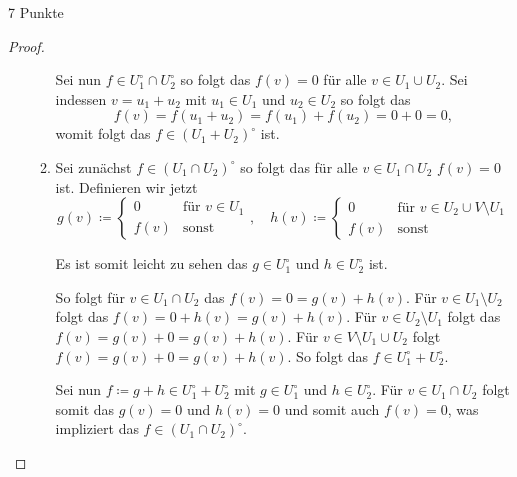 \documentclass{problemset}
\begin{document}
\begin{problem}{7 Punkte}
\begin{proof}
\begin{enumerate}
\begin{enumerate}
                        Sei nun \(f \in U_1^\circ \cap U_2^\circ\) so folgt das \(f(v) = 0\) für alle
                        \(v \in U_1 \cup U_2\). Sei indessen \(v = u_1 + u_2\) mit \(u_1 \in U_1\) und
                        \(u_2 \in U_2\) so folgt das
                        \begin{equation}
                            f(v) = f(u_1 + u_2) = f(u_1) + f(u_2) = 0 + 0 = 0,
                        \end{equation} womit folgt das \(f \in (U_1 + U_2)^\circ\) ist.

                  \item Sei zunächst \(f \in (U_1 \cap U_2)^\circ\) so folgt das für alle \(v \in U_1
                        \cap U_2\) \(f(v) = 0\) ist. Definieren wir jetzt
                        \begin{equation*}
                            g(v) \coloneq \left\{\begin{array}{lr}
                                0    & \text{für } v \in U_1 \\
                                f(v) & \text{sonst}
                            \end{array}\right., \quad
                            h(v) \coloneq \left\{\begin{array}{lr}
                                0    & \text{für } v \in U_2 \cup V \setminus U_1 \\
                                f(v) & \text{sonst}
                            \end{array}\right.
                        \end{equation*}

                        Es ist somit leicht zu sehen das \(g \in U_1^\circ\) und \(h \in U_2^\circ\)
                        ist.

                        So folgt für \(v \in U_1 \cap U_2\) das \(f(v) = 0 = g(v) + h(v)\). Für \(v \in
                        U_1 \setminus U_2\) folgt das \(f(v) = 0 + h(v) = g(v) + h(v)\). Für \(v \in
                        U_2 \setminus U_1\) folgt das \(f(v) = g(v) + 0 = g(v) + h(v)\). Für \(v \in V
                        \setminus U_1 \cup U_2\) folgt \(f(v) = g(v) + 0 = g(v) + h(v)\). So folgt das
                        \(f \in U_1^\circ + U_2^\circ\).

                        Sei nun \(f \coloneq g + h \in U_1^\circ + U_2^\circ\) mit \(g \in U_1^\circ\)
                        und \(h \in U_2^\circ\). Für \(v \in U_1 \cap U_2\) folgt somit das \(g(v) =
                        0\) und \(h(v) = 0\) und somit auch \(f(v) = 0\), was impliziert das \(f \in
                        (U_1 \cap U_2)^\circ\).


\end{enumerate}
\end{enumerate}
\end{proof}
\end{problem}
\end{document}
